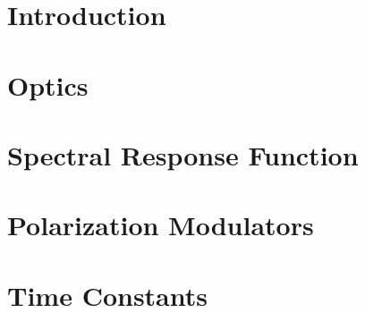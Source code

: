 \documentclass[
12pt, %
letterpaper, %
oneside, %
headinclude,footinclude, %
BCOR5mm, %
]{scrartcl}
\begin{document}

\section{Introduction}


\section{Optics}
%













\section{Spectral Response Function}



\section{Polarization Modulators}





















\section{Time Constants}




\end{document}
